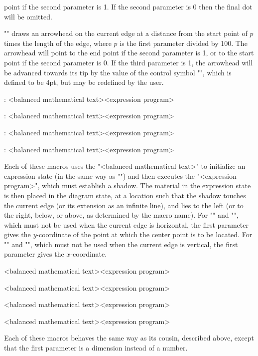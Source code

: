 \documentclass[11pt]{article}
\begin{document}
point if the second parameter is 1.  If the second parameter is 0 then
the final dot will be omitted.
\begin{myverb}
\end{myverb}
"\drawedgehead" draws an arrowhead on the current edge at a distance from
the start point of $p$ times the length of the edge, where $p$ is the first
parameter divided by 100.  The arrowhead will point to the end point if
the second parameter is 1, or to the start point if the second parameter
is 0.  If the third parameter is 1, the arrowhead will be advanced towards
its tip by the value of the control symbol "\edgeheaddisp", which is defined
to be 4pt, but may be redefined by the user.
\begin{myverb}
    :
        {<balanced mathematical text>}{<expression program>}

    :
        {<balanced mathematical text>}{<expression program>}

    :
        {<balanced mathematical text>}{<expression program>}

    :
        {<balanced mathematical text>}{<expression program>}
\end{myverb}
Each of these macros uses the "<balanced mathematical text>" to initialize
an expression state (in the same way as "\vertex") and then executes
the "<expression program>", which must establish a shadow.  The material in
the expression state is then placed in the diagram state, at a location
such that the shadow touches the current edge (or its extension as an
infinite line), and lies to the left (or to the right, below, or above,
as determined by the macro name).  For "\abutleft" and "\abutright", which
must not be used when the current edge is horizontal, the first parameter
gives the $y$-coordinate of the point at which the center point is to be
located.  For "\abutbelow" and "\abutabove", which must not be used when the
current edge is vertical, the first parameter gives the $x$-coordinate.
\begin{myverb}
        {<balanced mathematical text>}{<expression program>}

        {<balanced mathematical text>}{<expression program>}

        {<balanced mathematical text>}{<expression program>}

        {<balanced mathematical text>}{<expression program>}
\end{myverb}
Each of these macros behaves the same way as its cousin, described above,
except that the first parameter is a dimension instead of a number.
\end{document}
